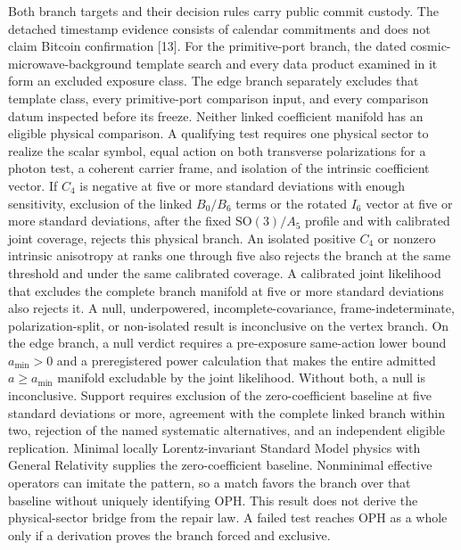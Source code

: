 \documentclass[10pt]{article}
\begin{document}
Both branch targets and their decision rules carry public commit custody. The
detached timestamp evidence consists of calendar commitments and does not
claim Bitcoin confirmation [13]. For the primitive-port branch, the dated
cosmic-microwave-background template search and every data product examined in
it form an excluded exposure class. The edge branch separately excludes that
template class, every primitive-port comparison input, and every comparison
datum inspected before its freeze. Neither linked coefficient manifold has an
eligible physical comparison. A qualifying test requires one
physical sector to realize the scalar symbol, equal action on both transverse
polarizations for a photon test, a coherent carrier frame, and isolation of
the intrinsic coefficient vector. If \(C_4\) is negative at five or more
standard deviations with enough sensitivity, exclusion of the linked
\(B_0/B_6\) terms or the rotated \(I_6\) vector at five or more standard
deviations, after the fixed \(\mathrm{SO}(3)/A_5\) profile and with calibrated
joint coverage, rejects this physical branch. An isolated positive \(C_4\) or
nonzero intrinsic anisotropy at ranks one through five also rejects the branch
at the same threshold and under the same calibrated coverage. A calibrated
joint likelihood that excludes the complete branch manifold at five or more
standard deviations also rejects it. A null, underpowered,
incomplete-covariance, frame-indeterminate, polarization-split, or non-isolated
result is inconclusive on the vertex branch. On the edge branch, a null
verdict requires a pre-exposure same-action lower bound \(a_{\min}>0\) and a
preregistered power calculation that makes the entire admitted
\(a\ge a_{\min}\) manifold excludable by the joint
likelihood. Without both, a null is inconclusive. Support requires exclusion of the
zero-coefficient baseline at five standard deviations or more, agreement with
the complete linked branch within two, rejection of the named systematic
alternatives, and an independent eligible replication. Minimal locally
Lorentz-invariant Standard Model physics with General Relativity supplies the
zero-coefficient baseline. Nonminimal effective operators can imitate the
pattern, so a match favors the branch over that baseline without uniquely
identifying OPH. This result does not derive the physical-sector bridge from
the repair law. A failed test reaches OPH as a whole only if a derivation
proves the branch forced and exclusive.
\end{document}
